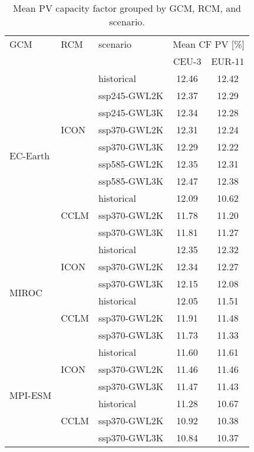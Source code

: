 \begin{table}[!htbp]
\centering
\caption{Mean PV capacity factor grouped by GCM, RCM, and scenario.}
\label{Table:CF_PV_changes}
\begin{tabular}{lll|cc}
\toprule
GCM & RCM & scenario & \multicolumn{2}{c}{Mean CF PV [\%]} \\
 & & & CEU-3 & EUR-11 \\
\midrule
\cmidrule(lr){1-5}
\multirow{10}{*}{EC-Earth} & \multirow{7}{*}{ICON} & historical & 12.46 & 12.42 \\
 &  & ssp245-GWL2K & 12.37 & 12.29 \\
 &  & ssp245-GWL3K & 12.34 & 12.28 \\
 &  & ssp370-GWL2K & 12.31 & 12.24 \\
 &  & ssp370-GWL3K & 12.29 & 12.22 \\
 &  & ssp585-GWL2K & 12.35 & 12.31 \\
 &  & ssp585-GWL3K & 12.47 & 12.38 \\
\cmidrule(lr){2-5}
 & \multirow{3}{*}{CCLM} & historical & 12.09 & 10.62 \\
 &  & ssp370-GWL2K & 11.78 & 11.20 \\
 &  & ssp370-GWL3K & 11.81 & 11.27 \\
\cmidrule(lr){2-5}
\multirow{6}{*}{MIROC} & \multirow{3}{*}{ICON} & historical & 12.35 & 12.32 \\
 &  & ssp370-GWL2K & 12.34 & 12.27 \\
 &  & ssp370-GWL3K & 12.15 & 12.08 \\
\cmidrule(lr){2-5}
 & \multirow{3}{*}{CCLM} & historical & 12.05 & 11.51 \\
 &  & ssp370-GWL2K & 11.91 & 11.48 \\
 &  & ssp370-GWL3K & 11.73 & 11.33 \\
\cmidrule(lr){2-5}
\multirow{6}{*}{MPI-ESM} & \multirow{3}{*}{ICON} & historical & 11.60 & 11.61 \\
 &  & ssp370-GWL2K & 11.46 & 11.46 \\
 &  & ssp370-GWL3K & 11.47 & 11.43 \\
\cmidrule(lr){2-5}
 & \multirow{3}{*}{CCLM} & historical & 11.28 & 10.67 \\
 &  & ssp370-GWL2K & 10.92 & 10.38 \\
 &  & ssp370-GWL3K & 10.84 & 10.37 \\
\bottomrule
\end{tabular}
\end{table}
